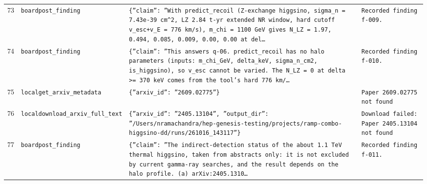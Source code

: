 \documentclass[11pt,a4paper]{article}
\begin{document}
\begin{longtable}{@{}p{}p{}p{}p{}@{}}
73 & \texttt{board}\newline\texttt{post\_\allowbreak{}finding} & \texttt{\{''claim'':\allowbreak{} ''With predict\_\allowbreak{}recoil (Z-exchange higgsino,\allowbreak{} sigma\_\allowbreak{}n =\allowbreak{} 7.43e-39 cm\textasciicircum{}\allowbreak{}2,\allowbreak{} LZ 2.84 t-yr extended NR window,\allowbreak{} hard cutoff v\_\allowbreak{}esc+v\_\allowbreak{}E =\allowbreak{} 776 km/\allowbreak{}s)\allowbreak{},\allowbreak{} m\_\allowbreak{}chi =\allowbreak{} 1100 GeV gives N\_\allowbreak{}LZ =\allowbreak{} 1.97,\allowbreak{} 0.494,\allowbreak{} 0.085,\allowbreak{} 0.009,\allowbreak{} 0.00,\allowbreak{} 0.00 at del\ldots{}\allowbreak{}} & \texttt{Recorded finding f-009.} \\
74 & \texttt{board}\newline\texttt{post\_\allowbreak{}finding} & \texttt{\{''claim'':\allowbreak{} ''This answers q-06. predict\_\allowbreak{}recoil has no halo parameters (inputs:\allowbreak{} m\_\allowbreak{}chi\_\allowbreak{}GeV,\allowbreak{} delta\_\allowbreak{}keV,\allowbreak{} sigma\_\allowbreak{}n\_\allowbreak{}cm2,\allowbreak{} is\_\allowbreak{}higgsino)\allowbreak{},\allowbreak{} so v\_\allowbreak{}esc cannot be varied. The N\_\allowbreak{}LZ =\allowbreak{} 0 at delta \textgreater{}\allowbreak{}=\allowbreak{} 370 keV comes from the tool's hard 776 km/\allowbreak{}\ldots{}\allowbreak{}} & \texttt{Recorded finding f-010.} \\
75 & \texttt{local}\newline\texttt{get\_\allowbreak{}arxiv\_\allowbreak{}metadata} & \texttt{\{''arxiv\_\allowbreak{}id'':\allowbreak{} ''2609.02775''\}\allowbreak{}} & \texttt{Paper 2609.02775 not found} \\
76 & \texttt{local}\newline\texttt{download\_\allowbreak{}arxiv\_\allowbreak{}full\_\allowbreak{}text} & \texttt{\{''arxiv\_\allowbreak{}id'':\allowbreak{} ''2405.13104'',\allowbreak{} ''output\_\allowbreak{}dir'':\allowbreak{} ''/\allowbreak{}Users/\allowbreak{}nramachandra/\allowbreak{}hep-genesis-testing/\allowbreak{}projects/\allowbreak{}ramp-combo-higgsino-dd/\allowbreak{}runs/\allowbreak{}261016\_\allowbreak{}143117''\}\allowbreak{}} & \texttt{Download failed:\allowbreak{} Paper 2405.13104 not found} \\
77 & \texttt{board}\newline\texttt{post\_\allowbreak{}finding} & \texttt{\{''claim'':\allowbreak{} ''The indirect-detection status of the about 1.1 TeV thermal higgsino,\allowbreak{} taken from abstracts only:\allowbreak{} it is not excluded by current gamma-ray searches,\allowbreak{} and the result depends on the halo profile. (a)\allowbreak{} arXiv:\allowbreak{}2405.1310\ldots{}\allowbreak{}} & \texttt{Recorded finding f-011.} \\

\end{longtable}
\end{document}
